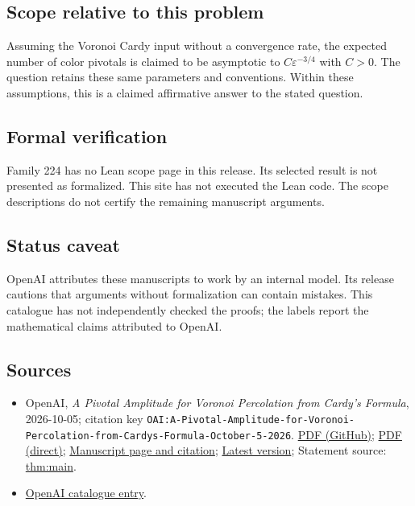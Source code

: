 \documentclass[11pt]{article}
\begin{document}
\subsection{Scope relative to this problem}
Assuming the Voronoi Cardy input without a convergence rate, the expected number of color pivotals is claimed to be asymptotic to $C\varepsilon^{-3/4}$ with $C>0$. The question retains these same parameters and conventions. Within these assumptions, this is a claimed affirmative answer to the stated question.

\subsection{Formal verification}
Family 224 has no Lean scope page in this release. Its selected result is not presented as formalized. This site has not executed the Lean code. The scope descriptions do not certify the remaining manuscript arguments.

\subsection{Status caveat}
OpenAI attributes these manuscripts to work by an internal model. Its release cautions that arguments without formalization can contain mistakes. This catalogue has not independently checked the proofs; the labels report the mathematical claims attributed to OpenAI.

\subsection{Sources}
\begin{itemize}
\item OpenAI, \emph{A Pivotal Amplitude for Voronoi Percolation from Cardy's Formula}, 2026-10-05; citation key \texttt{OAI:A-Pivotal-Amplitude-for-Voronoi-Percolation-from-Cardys-Formula-October-5-2026}. \href{https://github.com/openai/math/blob/adc7f1241b42e322a6451854ab7e4b4c146bf78a/preprints/A-Pivotal-Amplitude-for-Voronoi-Percolation-from-Cardys-Formula-October-5-2026/voronoi-pivotal-amplitude.pdf}{PDF (GitHub)}; \href{https://github.com/openai/math/raw/adc7f1241b42e322a6451854ab7e4b4c146bf78a/preprints/A-Pivotal-Amplitude-for-Voronoi-Percolation-from-Cardys-Formula-October-5-2026/voronoi-pivotal-amplitude.pdf}{PDF (direct)}; \href{https://github.com/openai/math/blob/adc7f1241b42e322a6451854ab7e4b4c146bf78a/preprints/A-Pivotal-Amplitude-for-Voronoi-Percolation-from-Cardys-Formula-October-5-2026/README.md}{Manuscript page and citation}; \href{https://github.com/openai/math/blob/main/preprints/A-Pivotal-Amplitude-for-Voronoi-Percolation-from-Cardys-Formula-October-5-2026/voronoi-pivotal-amplitude.pdf}{Latest version}; Statement source: \href{https://github.com/openai/math/blob/adc7f1241b42e322a6451854ab7e4b4c146bf78a/preprints/A-Pivotal-Amplitude-for-Voronoi-Percolation-from-Cardys-Formula-October-5-2026/build/sections/00-introduction.tex\#L35}{thm:main}.
\item \href{https://github.com/openai/math/blob/adc7f1241b42e322a6451854ab7e4b4c146bf78a/CONTENTS.md}{OpenAI catalogue entry}.
\end{itemize}
\end{document}
